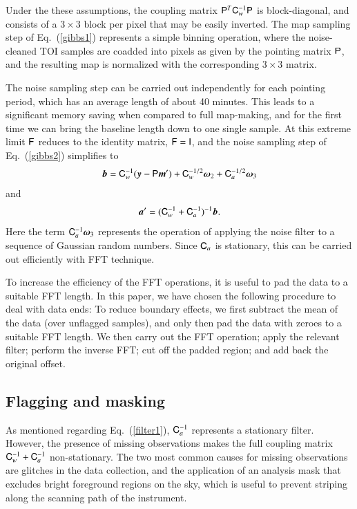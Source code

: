 \documentclass[twocolumn]{aa}
\newcommand{\ve}[1]{{\vec #1}}
\newcommand{\ma}[1]{\tens{#1}}
\begin{document}
Under the these assumptions, the coupling matrix $\ma P^T\ma
C_w^{-1}\ma P$ is block-diagonal, and consists of a $3\times3$ block
per pixel that may be easily inverted.  The map sampling step of
Eq.~(\ref{gibbs1}) represents a simple binning operation, where the
noise-cleaned TOI samples are coadded into pixels as given by the
pointing matrix $\ma P$, and the resulting map is normalized with the
corresponding $3\times3$ matrix.

The noise sampling step can be carried out independently for each
pointing period, which has an average length of about 40 minutes.
This leads to a significant memory saving when compared to full
map-making, and for the first time we can bring the baseline length
down to one single sample.  At this extreme limit $\ma F$ reduces to
the identity matrix, $\ma F=\ma I$, and the noise sampling step of
Eq.~(\ref{gibbs2}) simplifies to
%
\begin{equation}
\ve b =  \ma C_w^{-1} (\ve y -\ma P\ve m')
        +\ma C_w^{-1/2}\ve\omega_2 
        +\ma C_a^{-1/2}\ve\omega_3 \label{bdef}
\end{equation}
%
and
%
\begin{equation}
\ve a' = (\ma C_w^{-1} +\ma C_a^{-1})^{-1} \ve b. \label{filter1}
\end{equation}
%
Here the term $\ma C_a^{-1}\ve\omega_3$ represents the operation
of applying the noise filter to a sequence of Gaussian random numbers.
Since $\ma C_a$ is stationary, this can be carried out efficiently with FFT technique.

To increase the efficiency of the FFT operations, it is useful to pad
the data to a suitable FFT length.  In this
paper, we have chosen the following procedure to deal with data ends:
To reduce boundary effects, we first subtract the mean of the data
(over unflagged samples), and only then pad the data with zeroes to a
suitable FFT length. We then carry out the FFT operation; apply the
relevant filter; perform the inverse FFT; cut off the padded region;
and add back the original offset.

\subsection{Flagging and masking}

As mentioned regarding Eq.~(\ref{filter1}), $\ma C_a^{-1}$ represents
a stationary filter. However, the presence of missing observations
makes the full coupling matrix $\ma C_w^{-1} +\ma C_a^{-1}$
non-stationary. The two most common causes for missing observations
are glitches in the data collection, and the application of an
analysis mask that excludes bright foreground regions on the sky,
which is useful to prevent striping along the scanning path of the
instrument.
\end{document}
